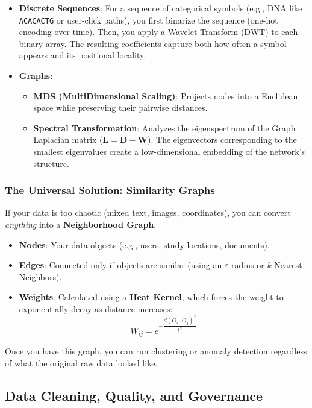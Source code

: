 \documentclass[11pt]{article}
\theoremstyle{smallexample}
\newcommand{\vs}{\vspace{0.2\baselineskip}}
\begin{document}
\begin{itemize}
    \item \textbf{Discrete Sequences}: For a sequence of categorical symbols (e.g., DNA like \texttt{ACACACTG} or user-click paths), you first binarize the sequence (one-hot encoding over time). Then, you apply a Wavelet Transform (DWT) to each binary array. The resulting coefficients capture both how often a symbol appears and its positional locality.
    \vs

    \item \textbf{Graphs}: 
    \begin{itemize}
        \item \textbf{MDS (MultiDimensional Scaling)}: Projects nodes into a Euclidean space while preserving their pairwise distances.
        \item \textbf{Spectral Transformation}: Analyzes the eigenspectrum of the Graph Laplacian matrix ($\mathbf{L} = \mathbf{D} - \mathbf{W}$). The eigenvectors corresponding to the smallest eigenvalues create a low-dimensional embedding of the network's structure.
    \end{itemize}
\end{itemize}

\subsubsection{The Universal Solution: Similarity Graphs}

If your data is too chaotic (mixed text, images, coordinates), you can convert \textit{anything} into a \textbf{Neighborhood Graph}. 
\begin{itemize}
    \item \textbf{Nodes}: Your data objects (e.g., users, study locations, documents).
    \item \textbf{Edges}: Connected only if objects are similar (using an $\varepsilon$-radius or $k$-Nearest Neighbors).
    \item \textbf{Weights}: Calculated using a \textbf{Heat Kernel}, which forces the weight to exponentially decay as distance increases:
    \[
        W_{ij} = e^{-\dfrac{d(O_i,\,O_j)^2}{t^2}}
    \]



\end{itemize}
Once you have this graph, you can run clustering or anomaly detection regardless of what the original raw data looked like.

\subsection{Data Cleaning, Quality, and Governance}
\end{document}
